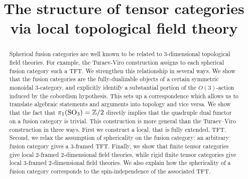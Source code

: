 \documentclass{amsart}
\begin{document}
\title{The structure of tensor categories \\ via local topological field theory}



	
\begin{abstract}
Spherical fusion categories are well known to be related to
$3$-dimensional topological field theories. For example, the Turaev-Viro
construction assigns to each spherical fusion category such a TFT.  We
strengthen this relationship in several ways. We show that the fusion
categories are the fully-dualizable objects of a certain symmetric
monoidal $3$-category, and explicitly identify a substantial portion of
the $O(3)$-action induced by the cobordism hypothesis. This sets up a
correspondence which allows us to translate algebraic statements and
arguments into topology and vice versa. We show that the fact that
$\pi_1(\mathrm{SO}_3) = \mathbb Z/2$ directly implies that the quadruple dual functor on a
fusion category is trivial. This construction is more general than the
Turaev--Viro construction in three ways. First we construct a local,
that is fully extended, TFT. Second, we relax the assumption of
sphericality on the fusion category: an arbitrary fusion category
gives a 3-framed TFT. Finally, we show that finite  tensor categories
give local 2-framed 2-dimensional field theories, while rigid finite tensor categories give local 3-framed 2-dimensional field theories. We also explain how
the sphericality of a fusion category corresponds to the
spin-independence of the associated TFT.
\end{abstract}	
	
\end{document}

